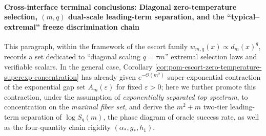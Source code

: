 
\paragraph{Cross-interface terminal conclusions: Diagonal zero-temperature selection, \texorpdfstring{$(m,q)$}{(m,q)} dual-scale leading-term separation, and the ``typical--extremal'' freeze discrimination chain}
This paragraph, within the framework of the escort family \(w_{m,q}(x)\propto d_m(x)^q\), records a set dedicated to ``diagonal scaling \(q=\tau m\)'' extremal selection laws and verifiable scalars.
In the general case, Corollary \ref{cor:pom-escort-zero-temperature-superexp-concentration} has already given
\(e^{-\Theta(m^2)}\) super-exponential contraction of the exponential gap set \(A_m(\varepsilon)\) for fixed \(\varepsilon>0\);
here we further promote this contraction, under the assumption of \emph{exponentially separated top spectrum}, to concentration on the \emph{maximal fiber set},
and derive the \(m^2+m\) two-tier leading-term separation of \(\log S_q(m)\), the phase diagram of oracle success rate, as well as the four-quantity chain rigidity \((\alpha_\ast,g_\ast,h_1)\).

